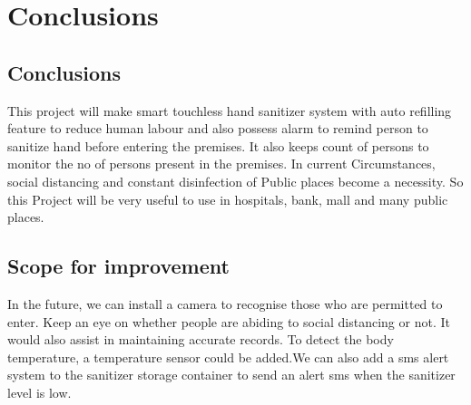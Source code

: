\newpage
\thispagestyle{empty}

\chapter{Conclusions}

\section{Conclusions}

 \hspace{0.5cm} This project will make smart touchless hand sanitizer system with auto refilling feature to reduce human labour and also possess alarm to remind person to sanitize hand before entering the premises. It also keeps count of persons to monitor the no of persons present in the premises. In current Circumstances, social distancing and constant disinfection of Public places become a necessity. So this Project will be very useful to use in hospitals, bank, mall and many public places.

\newpage
\section{Scope for improvement }
\vspace{1cm} 

  \hspace{0.5cm} In the future, we can install a camera to recognise those who are permitted to enter. Keep an eye on whether people are abiding to social distancing or not. It would also assist in maintaining accurate records. To detect the body temperature, a temperature sensor could be added.We can also add a sms alert system to the sanitizer storage container to send an alert sms when the sanitizer level is low.
